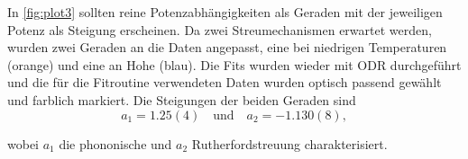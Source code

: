 In \autoref{fig:plot3} sollten reine Potenzabhängigkeiten als Geraden mit der jeweiligen Potenz als Steigung erscheinen. Da zwei Streumechanismen erwartet werden, wurden zwei Geraden an die Daten angepasst, eine bei niedrigen Temperaturen (orange) und eine an Hohe (blau). Die Fits wurden wieder mit ODR durchgeführt und die für die Fitroutine verwendeten Daten wurden optisch passend gewählt und farblich markiert. Die Steigungen der beiden Geraden sind
$$ a_1 = 1.25(4) \quad\text{und}\quad a_2 = -1.130(8),$$

wobei $a_1$ die phononische und $a_2$ Rutherfordstreuung charakterisiert.
